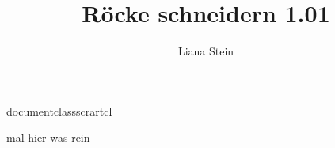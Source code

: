 documentclass{scrartcl}


\usepackage{amsmath}



  \title{R\"ocke schneidern 1.01}
  \author{Liana Stein}
\maketitle
mal hier was rein




